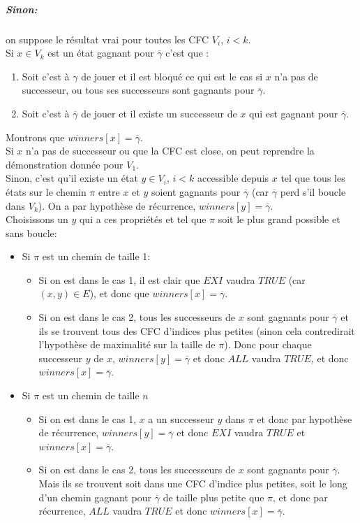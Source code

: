 \documentclass[10pt,a4paper]{article}
\begin{document}
\subparagraph{Sinon:} on suppose le résultat vrai pour toutes les CFC $V_i$, $i < k$.
\\
Si $x \in V_k$ est un état gagnant pour $\overline{\gamma}$ c'est que :
\begin{enumerate}
	\item Soit c'est à $\gamma$ de jouer et il est bloqué ce qui est le cas si $x$ n'a pas de successeur, ou tous ses successeurs sont gagnants pour $\overline{\gamma}$.
	\item Soit c'est à $\overline{\gamma}$ de jouer et il existe un successeur de $x$ qui est gagnant pour $\overline{\gamma}$.
\end{enumerate}
Montrons que $winners[x] = \overline{\gamma}$.\\
Si $x$ n'a pas de successeur ou que la CFC est close, on peut reprendre la démonstration donnée pour $V_1$.\\
Sinon, c'est qu'il existe un état $y \in V_i$, $ i < k$ accessible depuis $x$ tel que tous les états sur le chemin $\pi$ entre $x$ et $y$ soient gagnants pour $\overline{\gamma}$ (car $\overline{\gamma}$ perd s'il boucle dans $V_k$). On a par hypothèse de récurrence, $winners[y] = \overline{\gamma}$.\\
Choisissons un $y$ qui a ces propriétés et tel que $\pi$ soit le plus grand possible et sans boucle:
\begin{itemize}
	\item Si $\pi$ est un chemin de taille 1:
	\begin{itemize}
		\item Si on est dans le cas 1, il est clair que $EXI$ vaudra $TRUE$ (car $(x,y) \in E$), et donc que $winners[x] = \overline{\gamma}$.
		\item Si on est dans le cas 2, tous les successeurs de $x$ sont gagnants pour $\overline{\gamma}$ et ils se trouvent tous des CFC d'indices plus petites (sinon cela contredirait l'hypothèse de maximalité sur la taille de $\pi$). Donc pour chaque successeur $y$ de $x$, $winners[y] = \overline{\gamma}$ et donc $ALL$ vaudra $TRUE$, et donc $winners[x] = \overline{\gamma}$.
	\end{itemize}
	\item Si $\pi$ est un chemin de taille $n$
		\begin{itemize}
		\item Si on est dans le cas 1, $x$ a un successeur $y$ dans $\pi$ et donc par hypothèse de récurrence, $winners[y] = \overline{\gamma}$ et donc $EXI$ vaudra $TRUE$ et $winners[x] = \overline{\gamma}$.
		\item Si on est dans le cas 2, tous les successeurs de $x$ sont gagnants pour $\overline{\gamma}$. Mais ils se trouvent soit dans une CFC d'indice plus petites, soit le long d'un chemin gagnant pour $\overline{\gamma}$ de taille plus petite que $\pi$, et donc par récurrence, $ALL$ vaudra $TRUE$ et donc $winners[x] = \overline{\gamma}$.
	\end{itemize}
\end{itemize}
\end{document}
